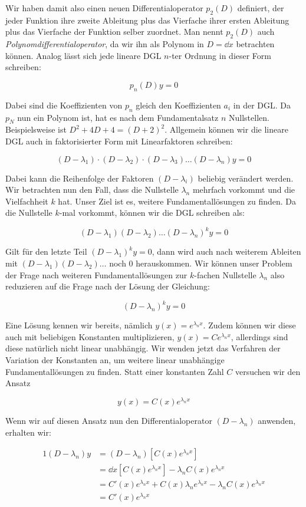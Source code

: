 Wir haben damit also einen neuen Differentialoperator $p_2(D)$ definiert, der jeder Funktion ihre zweite Ableitung plus das Vierfache ihrer ersten Ableitung plus das Vierfache der Funktion selber zuordnet. Man nennt $p_2(D)$ auch \emph{Polynomdifferentialoperator}, da wir ihn als Polynom in $D=\dd{}{x}$ betrachten können. Analog lässt sich jede lineare DGL $n$-ter Ordnung in dieser Form schreiben:

$$
    p_n(D) y = 0
$$

Dabei sind die Koeffizienten von $p_n$ gleich den Koeffizienten $a_i$ in der DGL. Da $p_N$ nun ein Polynom ist, hat es nach dem Fundamentalsatz $n$ Nullstellen. Beispielsweise ist $D^2+4D+4 = (D+2)^2$. Allgemein können wir die lineare DGL auch in faktorisierter Form mit Linearfaktoren schreiben:

$$
    (D-\lambda_1) \cdot (D-\lambda_2) \cdot (D-\lambda_3) \dots (D-\lambda_n) y = 0
$$

Dabei kann die Reihenfolge der Faktoren $(D-\lambda_i)$ beliebig verändert werden. Wir betrachten nun den Fall, dass die Nullstelle $\lambda_n$ mehrfach vorkommt und die Vielfachheit $k$ hat. Unser Ziel ist es, weitere Fundamentallösungen zu finden. Da die Nullstelle $k$-mal vorkommt, können wir die DGL schreiben als:

$$
    (D-\lambda_1) (D-\lambda_2) \dots (D-\lambda_n)^k y = 0
$$

Gilt für den letzte Teil $(D-\lambda_1)^k y = 0$, dann wird auch nach weiterem Ableiten mit $(D-\lambda_1) (D-\lambda_2) \dots$ noch $0$ herauskommen. Wir können unser Problem der Frage nach weiteren Fundamentallösungen zur $k$-fachen Nullstelle $\lambda_n$ also reduzieren auf die Frage nach der Lösung der Gleichung:

$$
    (D-\lambda_n)^k y = 0
$$

Eine Lösung kennen wir bereits, nämlich $y(x) = e^{\lambda_n x}$. Zudem können wir diese auch mit beliebigen Konstanten multiplizieren, $y(x) = C e^{\lambda_n x}$, allerdings sind diese natürlich nicht linear unabhängig. Wir wenden jetzt das Verfahren der Variation der Konstanten an, um weitere linear unabhängige Fundamentallösungen zu finden. Statt einer konstanten Zahl $C$ versuchen wir den Ansatz

$$
    y(x) = C(x) e^{\lambda_n x}
$$

Wenn wir auf diesen Ansatz nun den Differentialoperator $(D-\lambda_n)$ anwenden, erhalten wir:

\begin{alignat*}{1}
     (D-\lambda_n) y &= (D-\lambda_n) \left[ C(x) e^{\lambda_n x} \right] \\
                     &= \dd{}{x} \left[ C(x) e^{\lambda_n x} \right] - \lambda_n C(x) e^{\lambda_n x} \\
                     &= C'(x) e^{\lambda_n x} + C(x) \lambda_n e^{\lambda_n x} - \lambda_n C(x) e^{\lambda_n x} \\
                     &= C'(x) e^{\lambda_n x}
\end{alignat*}

